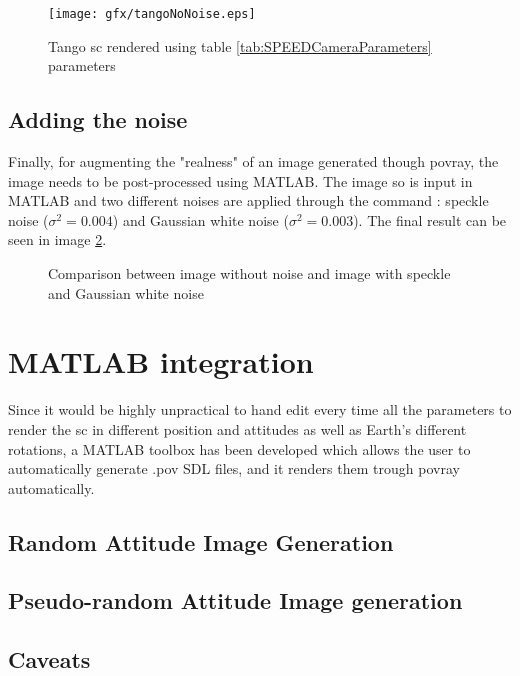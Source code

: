 \begin{figure}
  \centering
  \texttt{[image: gfx/tangoNoNoise.eps]}
  \caption{Tango \acrshort{sc} rendered using table \ref{tab:SPEEDCameraParameters} parameters}
  \label{fig:tangoNoNoise}
\end{figure}

\subsection{Adding the noise}
Finally, for augmenting the "realness" of an image generated though \acrshort{povray}, the image needs to be post-processed using MATLAB.
The image so is input in MATLAB and two different noises are applied through the  command : speckle noise ($\sigma^2 = 0.004$) and Gaussian white noise ($\sigma^2 = 0.003$).
The final result can be seen in image \ref{fig:comparisonNoise}.

\begin{figure}
  \centering
  \qquad
  \caption{Comparison between image without noise and image with speckle and Gaussian white noise}
  \label{fig:comparisonNoise}
\end{figure}

\section{MATLAB integration}
Since it would be highly unpractical to hand edit every time all the parameters to render the \acrshort{sc} in different position and attitudes as well as Earth's different rotations, a MATLAB toolbox has been developed which allows the user to automatically generate .pov SDL files, and it renders them trough \acrshort{povray} automatically.


\subsection{Random Attitude Image Generation}

\subsection{Pseudo-random Attitude Image generation}

\subsection{Caveats}